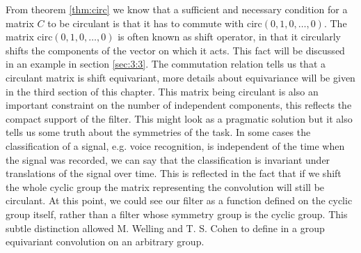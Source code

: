 \documentclass[../3.tex]{subfiles}
\begin{document}
    From theorem \ref{thm:circ} we know that a sufficient and necessary condition for a matrix $C$ to be circulant is that it has to commute
    with $\text{circ}(0,1,0,\dots,0)$.
    The matrix $\text{circ}(0,1,0,\dots,0)$ is often known as shift operator, in that it circularly shifts the components of the vector on which it acts.
    This fact will be discussed in an example in section \ref{sec:3:3}.
    The commutation relation tells us that a circulant matrix is shift equivariant, more details about equivariance will be given in the third section
    of this chapter. This matrix being circulant is also an important constraint on the number of independent components, this reflects the compact support of the filter.
    This might look as a pragmatic solution but it also tells us some truth about the symmetries of the task.
    In some cases the classification of a signal, e.g. voice recognition, is independent of the time when the signal was recorded,
    we can say that the classification is invariant under translations of the signal over time. {\color{red}This is reflected in the fact that if we 
    shift the whole cyclic group the matrix representing the convolution will still be circulant.}
    At this point, we could see our filter as a function defined on the cyclic group itself, rather than a filter whose symmetry group is the cyclic group.
    This subtle distinction allowed M. Welling and T. S. Cohen to define in \cite{gcnn} a group equivariant convolution on an arbitrary group.
    
\end{document}

